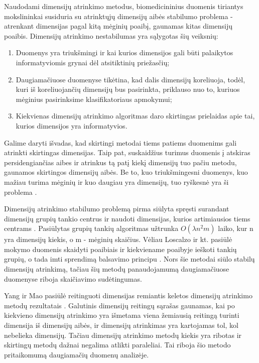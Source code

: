 Naudodami dimensijų atrinkimo metodus, biomedicininius duomenis tiriantys mokslininkai susiduria su atrinktųjų dimensijų aibės stabilumo problema - atrenkant dimensijas pagal kitą mėginių poaibį, gaunamas kitas dimensijų poaibis. Dimensijų atrinkimo nestabilumas yra sąlygotas šių veiksnių:
\begin{enumerate}
 \item Duomenys yra triukšmingi ir kai kurios dimensijos gali būti palaikytos informatyviomis grynai dėl atsitiktinių priežasčių;
 \item Daugiamačiuose duomenyse tikėtina, kad dalis dimensijų koreliuoja, todėl, kuri iš koreliuojančių dimensijų bus pasirinkta, priklauso nuo to, kuriuos mėginius pasirinksime klasifikatoriaus apmokymui;
 \item Kiekvienas dimensijų atrinkimo algoritmas daro skirtingas prielaidas apie tai, kurios dimensijos yra informatyvios.
\end{enumerate}
Galime daryti išvadas, kad skirtingi metodai tiems patiems duomenims gali atrinkti skirtingas dimensijas. Taip pat, suskaidžius turimus duomenis į atskiras persidengiančias aibes ir atrinkus tą patį kiekį dimensijų tuo pačiu metodu, gaunamos skirtingos dimensijų aibės. Be to, kuo triukšmingesni duomenys, kuo mažiau turima mėginių ir kuo daugiau yra dimensijų, tuo ryškesnė yra ši problema \cite{loscalzo2009consensus}.

Dimensijų atrinkimo stabilumo problemą pirma siūlyta spręsti surandant dimensijų grupių tankio centrus ir naudoti dimensijas, kurios artimiausios tiems centrams \cite{yu2008stable}. Pasiūlytas grupių tankių algoritmas užtrunka $O(\lambda n^2m)$ laiko, kur n yra dimensijų kiekis, o m - mėginių skaičius. Vėliau Loscalzo ir kt. pasiūlė mokymo duomenis skaidyti poaibiais ir kiekviename poaibyje ieškoti tankių grupių, o tada imti sprendimą balsavimo principu \cite{loscalzo2009consensus}. Nors šie metodai siūlo stabilų dimensijų atrinkimą, tačiau šių metodų panaudojamumą daugiamačiuose duomenyse riboja skaičiavimo sudėtingumas.

Yang ir Mao pasiūlė reitinguoti dimensijas remiantis keletos dimensijų atrinkimo metodų rezultatais \cite{yang2011robust}. Galutinis dimensijų reitingų sąrašas gaunamas, kai po kiekvieno dimensijų atrinkimo yra išmetama viena žemiausią reitingą turinti dimensija iš dimensijų aibės, ir dimensijų atrinkimas yra kartojamas tol, kol nebelieka dimensijų. Tačiau dimensijų atrinkimo metodų kiekis yra ribotas ir skirtingų metodų dažnai negalima atlikti paraleliai. Tai riboja šio metodo pritaikomumą daugiamačių duomenų analizėje.

